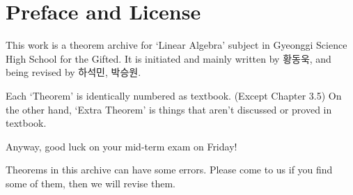 \chapter*{Preface and License}
This work is a theorem archive for `Linear Algebra' subject in Gyeonggi Science High School for the Gifted. It is initiated and mainly written by 황동욱, and being revised by 하석민, 박승원.

Each `Theorem' is identically numbered as textbook. (Except Chapter 3.5) On the other hand, `Extra Theorem' is things that aren't discussed or proved in textbook.

Anyway, good luck on your mid-term exam on Friday!

Theorems in this archive can have some errors. Please come to us if you find some of them, then we will revise them.
